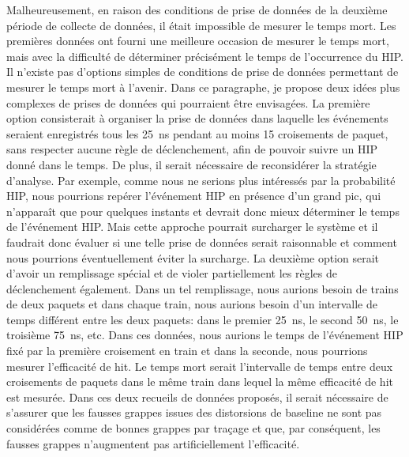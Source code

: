 Malheureusement, en raison des conditions de prise de données de la deuxième période de collecte de données, il était impossible de mesurer le temps mort. Les premières données ont fourni une meilleure occasion de mesurer le temps mort, mais avec la difficulté de déterminer précisément le temps de l'occurrence du HIP. Il n’existe pas d’options simples de conditions de prise de données permettant de mesurer le temps mort à l’avenir. Dans ce paragraphe, je propose deux idées plus complexes de prises de données qui pourraient être envisagées. La première option consisterait à organiser la prise de données dans laquelle les événements seraient enregistrés tous les 25~ns pendant au moins 15 croisements de paquet, sans respecter aucune règle de déclenchement, afin de pouvoir suivre un HIP donné dans le temps. De plus, il serait nécessaire de reconsidérer la stratégie d’analyse. Par exemple, comme nous ne serions plus intéressés par la probabilité HIP, nous pourrions repérer l’événement HIP en présence d’un grand pic, qui n’apparaît que pour quelques instants et devrait donc mieux déterminer le temps de l’événement HIP. Mais cette approche pourrait surcharger le système et il faudrait donc évaluer si une telle prise de données serait raisonnable et comment nous pourrions éventuellement éviter la surcharge. La deuxième option serait d'avoir un remplissage spécial et de violer partiellement les règles de déclenchement également. Dans un tel remplissage, nous aurions besoin de trains de deux paquets et dans chaque train, nous aurions besoin d'un intervalle de temps différent entre les deux paquets: dans le premier 25~ns, le second 50~ns, le troisième 75~ns, etc. Dans ces données, nous aurions le temps de l'événement HIP fixé par la première croisement en train et dans la seconde, nous pourrions mesurer l'efficacité de hit. Le temps mort serait l'intervalle de temps entre deux croisements de paquets dans le même train dans lequel la même efficacité de hit est mesurée. Dans ces deux recueils de données proposés, il serait nécessaire de s'assurer que les fausses grappes issues des distorsions de baseline ne sont pas considérées comme de bonnes grappes par traçage et que, par conséquent, les fausses grappes n'augmentent pas artificiellement l'efficacité.


